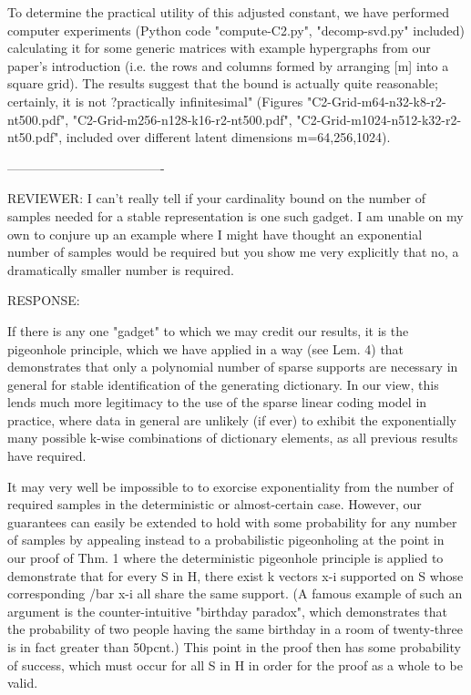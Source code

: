 To determine the practical utility of this adjusted constant, we have performed computer experiments (Python code "compute-C2.py", "decomp-svd.py" included) calculating it for some generic matrices with example hypergraphs from our paper's introduction (i.e. the rows and columns formed by arranging [m] into a square grid). The results suggest that the bound is actually quite reasonable; certainly, it is not ?practically infinitesimal" (Figures "C2-Grid-m64-n32-k8-r2-nt500.pdf", "C2-Grid-m256-n128-k16-r2-nt500.pdf", "C2-Grid-m1024-n512-k32-r2-nt50.pdf", included over different latent dimensions m=64,256,1024).

-------------------------------------

REVIEWER: I can't really tell if your cardinality bound on the number of samples
needed for a stable representation is one such gadget. I am unable on my
own to conjure up an example where I might have thought an exponential
number of samples would be required but you show me very explicitly that
no, a dramatically smaller number is required.

RESPONSE:

If there is any one "gadget" to which we may credit our results, it is the pigeonhole principle, which we have applied in a way (see Lem. 4) that demonstrates that only a polynomial number of sparse supports are necessary in general for stable identification of the generating dictionary. In our view, this lends much more legitimacy to the use of the sparse linear coding model in practice, where data in general are unlikely (if ever) to exhibit the exponentially many possible k-wise combinations of dictionary elements, as all previous results have required.

It may very well be impossible to to exorcise exponentiality from the number of required samples in the deterministic or almost-certain case. However, our guarantees can easily be extended to hold with some probability for any number of samples by appealing instead to a probabilistic pigeonholing at the point in our proof of Thm. 1 where the deterministic pigeonhole principle is applied to demonstrate that for every S in H, there exist k vectors x-i supported on S whose corresponding /bar x-i all share the same support. (A famous example of such an argument is the counter-intuitive "birthday paradox", which demonstrates that the probability of two people having the same birthday in a room of twenty-three is in fact greater than 50pcnt.) This point in the proof then has some probability of success, which must occur for all S in H in order for the proof as a whole to be valid.

